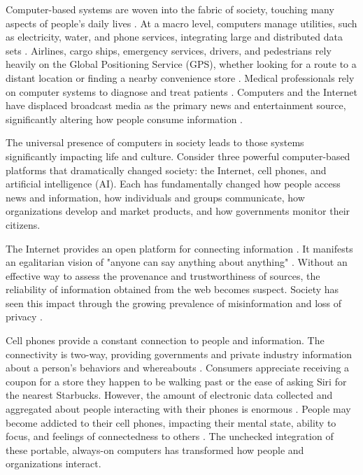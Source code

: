 Computer-based systems are woven into the fabric of society, touching many aspects of people’s daily lives \parencite{koya_measuring_2020}. At a macro level, computers manage utilities, such as electricity, water, and phone services, integrating large and distributed data sets \parencite{koya_measuring_2020}. Airlines, cargo ships, emergency services, drivers, and pedestrians rely heavily on the Global Positioning Service (GPS), whether looking for a route to a distant location or finding a nearby convenience store \parencite{mcneff_global_2002}. Medical professionals rely on computer systems to diagnose and treat patients \parencite{cirillo_sex_2020}. Computers and the Internet have displaced broadcast media as the primary news and entertainment source, significantly altering how people consume information \parencite{chalaby_television_2016}.

The universal presence of computers in society leads to those systems significantly impacting life and culture. Consider three powerful computer-based platforms that dramatically changed society: the Internet, cell phones, and artificial intelligence (AI). Each has fundamentally changed how people access news and information, how individuals and groups communicate, how organizations develop and market products, and how governments monitor their citizens.

The Internet provides an open platform for connecting information \parencite{berners-lee_world-wide_2010}. It manifests an egalitarian vision of 
"anyone can say anything about anything" \parencite{noauthor_resource_nodate}. Without an effective way to assess the provenance and trustworthiness of sources, the reliability of information obtained from the web becomes suspect. Society has seen this impact through the growing prevalence of misinformation and loss of privacy \parencite{berners-lee_we_2014,zhou_survey_2020}. 

Cell phones provide a constant connection to people and information. The connectivity is two-way, providing governments and private industry information about a person's behaviors and whereabouts \parencite{dienlin_is_2015}. Consumers appreciate receiving a coupon for a store they happen to be walking past or the ease of asking Siri for the nearest Starbucks. However, the amount of electronic data collected and aggregated about people interacting with their phones is enormous \parencite{dienlin_is_2015}. People may become addicted to their cell phones, impacting their mental state, ability to focus, and feelings of connectedness to others \parencite{de-sola_gutierrez_cell-phone_2016}. The unchecked integration of these portable, always-on computers has transformed how people and organizations interact.

